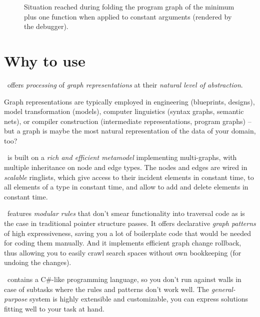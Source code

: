 \begin{figure}[htbp]
	\centering
	\qquad
	\caption{Situation reached during folding the program graph of the minimum plus one function when applied to constant arguments (rendered by the debugger).}
	\label{fig:cmpcondfold}
\end{figure}


\section{Why to use \GrG}

\GrG\ offers \emph{processing} of \emph{graph representations} at their \emph{natural level of abstraction}.

Graph representations are typically employed in engineering (blueprints, designs), model transformation (models), computer linguistics (syntax graphs, semantic nets), or compiler construction (intermediate representations, program graphs) -- but a graph is maybe the most natural representation of the data of your domain, too?

\GrG\ is built on a \emph{rich and efficient metamodel} implementing multi-graphs, with multiple inheritance on node and edge types.
The nodes and edges are wired in \emph{scalable} ringlists, which give access to their incident elements in constant time, to all elements of a type in constant time, and allow to add and delete elements in constant time.

\GrG\ features \emph{modular rules} that don't smear functionality into traversal code as is the case in traditional pointer structure passes.
It offers declarative \emph{graph patterns} of high expressiveness, saving you a lot of boilerplate code that would be needed for coding them manually.
And it implements efficient graph change rollback, thus allowing you to easily crawl search spaces without own bookkeeping (for undoing the changes).

\GrG\ contains a C\#-like programming language, so you don't run against walls in case of subtasks where the rules and patterns don't work well.
The \emph{general-purpose} system is highly extensible and customizable, you can express solutions fitting well to your task at hand.

